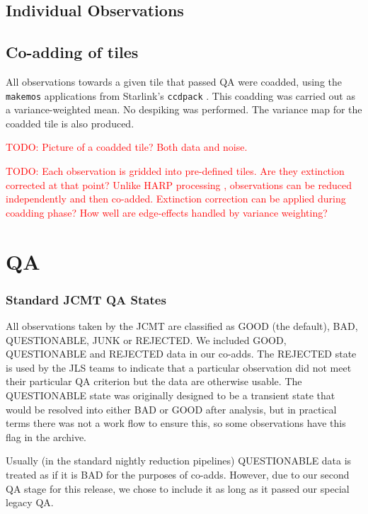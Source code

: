 \documentclass[usenatbib]{mn2e}
\newcommand{\todo}[1]{\textcolor{red}{TODO: #1}}
\newcommand{\ascl}[1]{\href{http://www.ascl.net/#1}{ascl:#1}}
\newcommand{\status}[1]{\textsf{#1}}
\begin{document}
\subsection{Individual Observations}

\subsection{Co-adding of tiles}
All observations towards a given tile that passed QA were coadded,
using the \texttt{makemos} applications from Starlink's
\texttt{ccdpack} \citep[][\ascl{1403.021}]{SUN139}. This coadding was carried out as a variance-weighted
mean. No despiking was performed. The variance map for the coadded
tile is also produced.

\todo{Picture of a coadded tile? Both data and noise.}


\todo{Each observation is gridded into pre-defined tiles. Are they
  extinction corrected at that point? Unlike HARP processing
  \citep{2015ACSISDR}, observations can be reduced independently and
  then co-added. Extinction correction can be applied during coadding
  phase? How well are edge-effects handled by variance weighting?}


\section{QA}
\label{sec:QA}
\subsubsection{Standard JCMT QA States}
All observations taken by the JCMT are classified as \status{GOOD} (the
default), \status{BAD}, \status{QUESTIONABLE}, \status{JUNK} or \status{REJECTED}. We included
\status{GOOD}, \status{QUESTIONABLE} and \status{REJECTED} data in our co-adds. The \status{REJECTED}
state is used by the JLS teams to indicate that a particular
observation did not meet their particular QA criterion but the data
are otherwise usable. The \status{QUESTIONABLE}
state was originally designed to be a transient state that would be
resolved into either \status{BAD} or \status{GOOD} after analysis, but in practical
terms there was not a work flow to ensure this, so some observations
have this flag in the archive.

Usually (in the standard nightly reduction pipelines) \status{QUESTIONABLE}
data is treated as if it is \status{BAD} for the purposes of co-adds. However,
due to our second QA stage for this release, we chose to include it as
long as it passed our special legacy QA.
\end{document}
